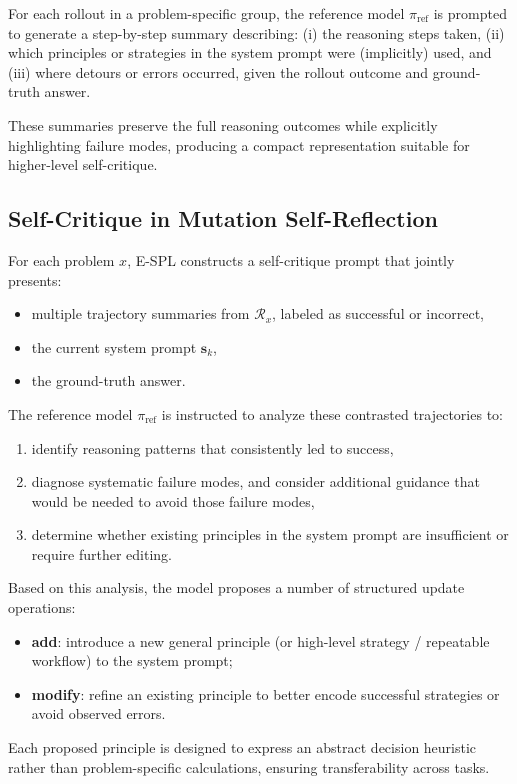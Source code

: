 \documentclass{article}
\theoremstyle{plain}
\theoremstyle{definition}
\theoremstyle{remark}
\begin{document}
For each rollout in a problem-specific group, the reference model $\pi_{\text{ref}}$ is prompted to generate a step-by-step summary describing:
(i) the reasoning steps taken, 
(ii) which principles or strategies in the system prompt were (implicitly) used, and 
(iii) where detours or errors occurred, given the rollout outcome and ground-truth answer.  

These summaries preserve the full reasoning outcomes while explicitly highlighting failure modes, producing a compact representation suitable for higher-level self-critique.

\subsection{Self-Critique in Mutation Self-Reflection}
\label{sec:appendix-local-critique}

For each problem $x$, E-SPL constructs a self-critique prompt that jointly presents:
\vspace{-5pt}
\begin{itemize}
    \item multiple trajectory summaries from $\mathcal{R}_x$, labeled as successful or incorrect,
    \item the current system prompt $\mathbf{s}_k$,
    \item the ground-truth answer.
\end{itemize}
The reference model $\pi_{\text{ref}}$ is instructed to analyze these contrasted trajectories to:
\vspace{-5pt}
\begin{enumerate}
    \item identify reasoning patterns that consistently led to success,
    \item diagnose systematic failure modes, and consider additional guidance that would be needed to avoid those failure modes,
    \item determine whether existing principles in the system prompt are insufficient or require further editing.
\end{enumerate}
Based on this analysis, the model proposes a number of structured update operations:
\begin{itemize}
    \item \textbf{add}: introduce a new general principle (or high-level strategy / repeatable workflow) to the system prompt;
    \item \textbf{modify}: refine an existing principle to better encode successful strategies or avoid observed errors.
\end{itemize}
Each proposed principle is designed to express an abstract decision heuristic rather than problem-specific calculations, ensuring transferability across tasks.
\end{document}
